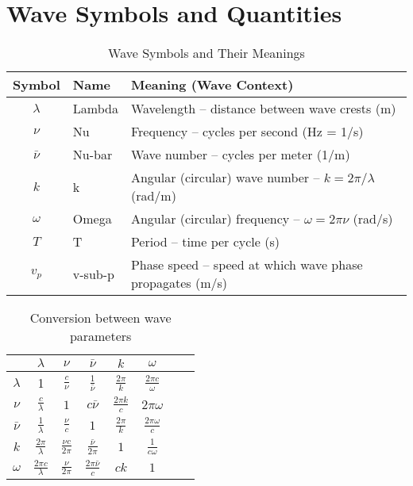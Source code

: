 \documentclass[12pt, a4paper]{article} %
\begin{document}
\section{Wave Symbols and Quantities}

\begin{table}[H]
\centering
\renewcommand{\arraystretch}{1.3}
\begin{tabular}{|c|l|l|}
\hline
\textbf{Symbol} & \textbf{Name} & \textbf{Meaning (Wave Context)} \\
\hline
$\lambda$       & Lambda     & Wavelength – distance between wave crests (m) \\
$\nu$           & Nu         & Frequency – cycles per second (Hz = 1/s) \\
$\bar{\nu}$     & Nu-bar     & Wave number – cycles per meter (1/m) \\
$k$             & k          & Angular (circular) wave number – $k = 2\pi/\lambda$ (rad/m) \\
$\omega$        & Omega      & Angular (circular) frequency – $\omega = 2\pi\nu$ (rad/s) \\
$T$             & T          & Period – time per cycle (s) \\
$v_p$           & v-sub-p    & Phase speed – speed at which wave phase propagates (m/s) \\
\hline
\end{tabular}
\caption{Wave Symbols and Their Meanings}
\end{table}

\begin{table}[H]
\centering
\begin{tabular}{|c|c|c|c|c|c|c|c|}
\hline
& $\lambda$ & $\nu$ & $\bar{\nu}$ & $k$ & $\omega$  \\[1ex]
\hline
$\lambda$ & 1 & $\frac{c}{\nu}$ & $\frac{1}{\bar{\nu}}$ & $\frac{2\pi}{k}$ & $\frac{2\pi c}{\omega}$ \\[1ex] \hline
$\nu$ & $\frac{c}{\lambda}$ & $1$ & $c\bar{\nu}$ & $\frac{2\pi k}{c}$ & $2\pi\omega$ \\[1ex] \hline
$\bar{\nu}$ & $\frac{1}{\lambda}$ & $\frac{\nu}{c}$ & $1$ & $\frac{2\pi}{k}$ & $\frac{2\pi \omega}{c}$ \\ [1ex] \hline
$k$ & $\frac{2\pi}{\lambda}$ & $\frac{\nu c}{2\pi}$ & $\frac{\bar{\nu}}{2\pi}$ & $1$ & $\frac{1}{c\omega}$ \\[1ex] \hline
$\omega$ & $\frac{2\pi c}{\lambda}$ & $\frac{\nu}{2\pi}$ & $\frac{2\pi \bar{\nu}}{c}$ & $ck$ & $1$ \\ [1ex] \hline
\end{tabular}
\caption{Conversion between wave parameters}
\end{table}
\end{document}

